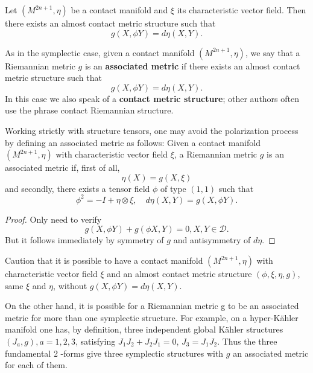 \begin{theorem}
    Let $\left(M^{2 n+1}, \eta\right)$ be a contact manifold and $\xi$ its characteristic vector field. Then there exists an almost contact metric structure such that 
    $$g(X, \phi Y)=d \eta(X, Y).$$
\end{theorem}

\begin{definition}
    As in the symplectic case, given a contact manifold $\left(M^{2 n+1}, \eta\right)$, we say that a Riemannian metric $g$ is an \textbf{associated metric} if there exists an almost contact metric structure such that 
   $$g(X, \phi Y)=d \eta(X, Y).$$
    In this case we also speak of a\textbf{ contact metric structure}; other authors often use the phrase contact Riemannian structure. 
\end{definition}
\begin{definition}
    Working strictly with structure tensors, one may avoid the polarization process by defining an associated metric as follows: Given a contact manifold $\left(M^{2 n+1}, \eta\right)$ with characteristic vector field $\xi$, a Riemannian metric $g$ is an associated metric if, first of all,
$$
\eta(X)=g(X, \xi)
$$
and secondly, there exists a tensor field $\phi$ of type $(1,1)$ such that
$$
\phi^2=-I+\eta \otimes \xi, \quad d \eta(X, Y)=g(X, \phi Y) .
$$
\end{definition}
\begin{proof}
    Only need to verify 
    \begin{equation}
        g(X,\phi Y)+g(\phi  X,Y)=0, X,Y \in \mathcal{D}.
    \end{equation}
    But it follows immediately by symmetry of $g$ and antisymmetry of $d\eta$.
\end{proof}
\begin{remark}
    Caution that it is possible to have a contact manifold $\left(M^{2 n+1}, \eta\right)$ with characteristic vector field $\xi$ and an almost contact metric structure $(\phi, \xi, \eta, g)$, same $\xi$ and $\eta$, without $g(X, \phi Y)=d \eta(X, Y)$.
\end{remark}
\begin{remark}
    On the other hand, it is possible for a Riemannian metric g to be an associated metric for more than one symplectic structure. For example, on a hyper-Kähler manifold one has, by definition, three independent global Kähler structures $\left(J_a, g\right), a=1,2,3$, satisfying $J_1 J_2+J_2 J_1=0$, $J_3=J_1 J_2$. Thus the three fundamental 2 -forms give three symplectic structures with $g$ an associated metric for each of them.
\end{remark}

